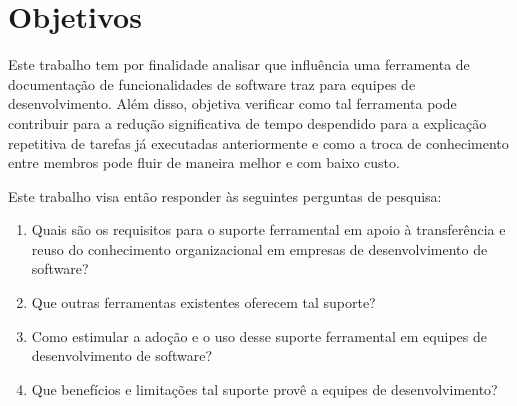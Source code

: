 \chapter{Objetivos}

Este trabalho tem por finalidade analisar que influência uma ferramenta de documentação de funcionalidades de software traz para equipes de desenvolvimento. Além disso, objetiva verificar como tal ferramenta pode contribuir para a redução significativa de tempo despendido para a explicação repetitiva de tarefas já executadas anteriormente e como a troca de conhecimento entre membros pode fluir de maneira melhor e com baixo custo.




Este trabalho visa então responder às seguintes perguntas de pesquisa:

\begin{enumerate}
\item Quais são os requisitos para o suporte ferramental em apoio à transferência e reuso do conhecimento organizacional em empresas de desenvolvimento de software?
\item Que outras ferramentas existentes oferecem tal suporte?
\item Como estimular a adoção e o uso desse suporte ferramental em equipes de desenvolvimento de software? 
\item Que benefícios e limitações tal suporte provê a equipes de desenvolvimento?

\end{enumerate}

